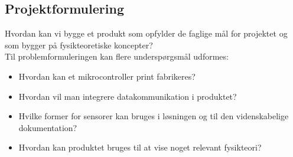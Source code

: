 \subsection{Projektformulering}

Hvordan kan vi bygge et produkt som opfylder de faglige mål for projektet og som bygger på fysikteoretiske koncepter?\\

Til problemformuleringen kan flere underspørgsmål udformes:
\begin{itemize}
\item Hvordan kan et mikrocontroller print fabrikeres?
\item Hvordan vil man integrere datakommunikation i produktet? 
\item Hvilke former for sensorer kan bruges i løsningen og til den videnskabelige dokumentation?
\item Hvordan kan produktet bruges til at vise noget relevant fysikteori?
\end{itemize}


